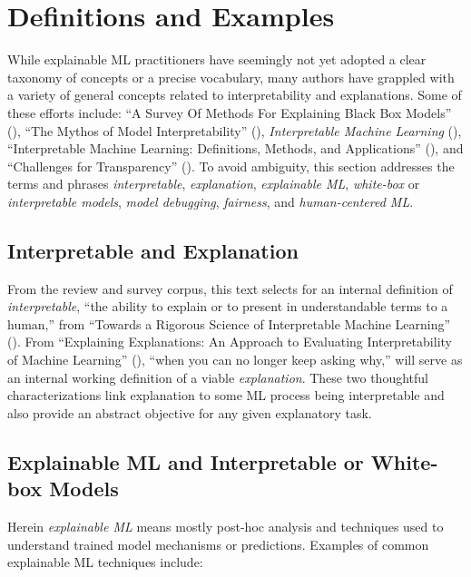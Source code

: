 \documentclass[fleqn]{article}
\begin{document}
\section{Definitions and Examples} \label{sec:intro}

While explainable ML practitioners have seemingly not yet adopted a clear taxonomy of concepts or a precise vocabulary, many authors have grappled with a variety of general concepts related to interpretability and explanations. Some of these efforts include: ``A Survey Of Methods For Explaining Black Box Models'' (\citet{guidotti2018survey}), ``The Mythos of Model Interpretability'' (\citet{lipton1}), \textit{Interpretable Machine Learning} (\citet{molnar}), ``Interpretable Machine Learning: Definitions,
Methods, and Applications'' (\citet{murdoch2019interpretable}), and ``Challenges for Transparency'' (\citet{weller2017challenges}). To avoid ambiguity, this section addresses the terms and phrases \textit{interpretable}, \textit{explanation}, \textit{explainable ML}, \textit{white-box} or \textit{interpretable models}, \textit{model debugging}, \textit{fairness}, and \textit{human-centered ML}.

\subsection{Interpretable and Explanation}

From the review and survey corpus, this text selects for an internal definition of \textit{interpretable}, ``the ability to explain or to present in understandable terms to a human,'' from ``Towards a Rigorous Science of Interpretable Machine Learning'' (\citet{been_kim1}). From ``Explaining Explanations: An Approach to Evaluating Interpretability of Machine Learning'' (\citet{gilpin2018explaining}), ``when you can no longer keep asking why,'' will serve as an internal working definition of a viable \textit{explanation}. These two thoughtful characterizations link explanation to some ML process being interpretable and also provide an abstract objective for any given explanatory task. 

\subsection{Explainable ML and Interpretable or White-box Models }

Herein \textit{explainable ML} means mostly post-hoc analysis and techniques used to understand trained model mechanisms or predictions. Examples of common explainable ML techniques include:
\end{document}
